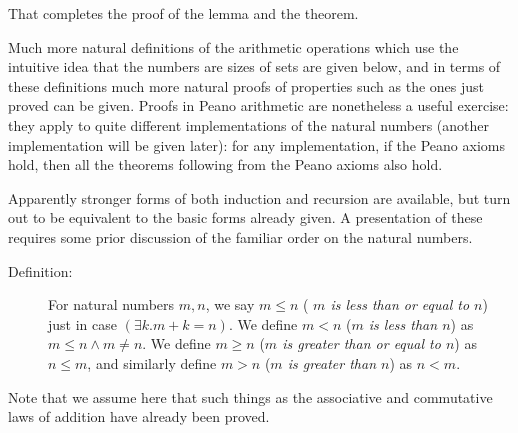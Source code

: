 \documentclass[12pt]{book}
\begin{document}
That completes the proof of the lemma and the theorem.

Much more natural definitions of the arithmetic operations which use
the intuitive idea that the numbers are sizes of sets are given below,
and in terms of these definitions much more natural proofs of
properties such as the ones just proved can be given.  Proofs in Peano
arithmetic are nonetheless a useful exercise: they apply to quite
different implementations of the natural numbers (another
implementation will be given later): for any implementation, if the
Peano axioms hold, then all the theorems following from the Peano
axioms also hold.

Apparently stronger forms of both induction and recursion are
available, but turn out to be equivalent to the basic forms already
given.  A presentation of these requires some prior discussion of the
familiar order on the natural numbers.

\begin{description}

\item[Definition:] For natural numbers $m,n$, we say $m\leq n$ ({\em
$m$ is less than or equal to $n$\/}) just in case $(\exists k.m+k=n)$.
We define $m<n$ ({\em $m$ is less than $n$\/}) as $m \leq n \wedge m
\neq n$.  We define $m\geq n$ ({\em $m$ is greater than or equal to
$n$\/}) as $n\leq m$, and similarly define $m>n$ ({\em $m$ is greater
than $n$\/}) as $n<m$.

\end{description}

Note that we assume here that such things as the associative and
commutative laws of addition have already been proved.
\end{document}
